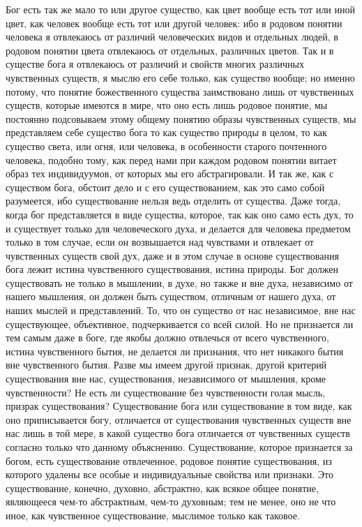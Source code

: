 \documentclass[12pt]{article}
\begin{document}
Бог есть так же мало то или другое существо, как цвет вообще есть тот или иной цвет, как человек вообще есть тот или другой человек: ибо в родовом понятии человека я отвлекаюсь от различий человеческих видов и отдельных людей, в родовом понятии цвета отвлекаюсь от отдельных, различных цветов. Так и в существе бога я отвлекаюсь от различий и свойств многих различных чувственных существ, я мыслю его себе только, как существо вообще; но именно потому, что понятие божественного существа заимствовано лишь от чувственных существ, которые имеются в мире, что оно есть лишь родовое понятие, мы постоянно подсовываем этому общему понятию образы чувственных существ, мы представляем себе существо бога то как существо природы в целом, то как существо света, или огня, или человека, в особенности старого почтенного человека, подобно тому, как перед нами при каждом родовом понятии витает образ тех индивидуумов, от которых мы его абстрагировали. И так же, как с существом бога, обстоит дело и с его существованием, как это само собой разумеется, ибо существование нельзя ведь отделить от существа. Даже тогда, когда бог представляется в виде существа, которое, так как оно само есть дух, то и существует только для человеческого духа, и делается для человека предметом только в том случае, если он возвышается над чувствами и отвлекает от чувственных существ свой дух, даже и в этом случае в основе существования бога лежит истина чувственного существования, истина природы. Бог должен существовать не только в мышлении, в духе, но также и вне духа, независимо от нашего мышления, он должен быть существом, отличным от нашего духа, от наших мыслей и представлений. То, что он существо от нас независимое, вне нас существующее, объективное, подчеркивается со всей силой. Но не признается ли тем самым даже в боге, где якобы должно отвлечься от всего чувственного, истина чувственного бытия, не делается ли признания, что нет никакого бытия вне чувственного бытия. Разве мы имеем другой признак, другой критерий существования вне нас, существования, независимого от мышления, кроме чувственности? Не есть ли существование без чувственности голая мысль, призрак существования? Существование бога или существование в том виде, как оно приписывается богу, отличается от существования чувственных существ вне нас лишь в той мере, в какой существо бога отличается от чувственных существ согласно только что данному объяснению. Существование, которое признается за богом, есть существование отвлеченное, родовое понятие существования, из которого удалены все особые и индивидуальные свойства или признаки. Это существование, конечно, духовно, абстрактно, как всякое общее понятие, являющееся чем-то абстрактным, чем-то духовным; тем не менее, оно не что иное, как чувственное существование, мыслимое только как таковое. 
\end{document}
